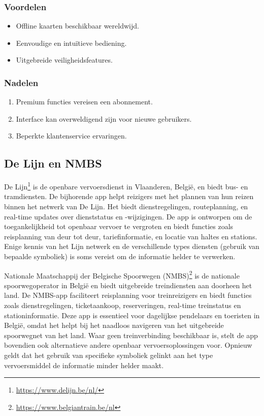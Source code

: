 \subsubsection*{Voordelen}
\begin{itemize}
    \item Offline kaarten beschikbaar wereldwijd.
    \item Eenvoudige en intuïtieve bediening.
    \item Uitgebreide veiligheidsfeatures.
\end{itemize}
\subsubsection*{Nadelen}
\begin{enumerate}
    \item Premium functies vereisen een abonnement.
    \item Interface kan overweldigend zijn voor nieuwe gebruikers.
    \item Beperkte klantenservice ervaringen.
\end{enumerate}

\subsection{De Lijn en NMBS}
De Lijn\footnote{\url{https://www.delijn.be/nl/}} is de openbare vervoersdienst in Vlaanderen, België, en biedt bus- en tramdiensten. De bijhorende app helpt reizigers met het plannen van hun reizen binnen het netwerk van De Lijn. Het biedt dienstregelingen, routeplanning, en real-time updates over dienststatus en -wijzigingen. De app is ontworpen om de toegankelijkheid tot openbaar vervoer te vergroten en biedt functies zoals reisplanning van deur tot deur, tariefinformatie, en locatie van haltes en stations. Enige kennis van het Lijn netwerk en de verschillende types diensten (gebruik van bepaalde symboliek) is soms vereist om de informatie helder te verwerken.

Nationale Maatschappij der Belgische Spoorwegen (NMBS)\footnote{\url{https://www.belgiantrain.be/nl}} is de nationale spoorwegoperator in België en biedt uitgebreide treindiensten aan doorheen het land. De NMBS-app faciliteert reisplanning voor treinreizigers en biedt functies zoals dienstregelingen, ticketaankoop, reserveringen, real-time treinstatus en stationinformatie. Deze app is essentieel voor dagelijkse pendelaars en toeristen in België, omdat het helpt bij het naadloos navigeren van het uitgebreide spoorwegnet van het land. Waar geen treinverbinding beschikbaar is, stelt de app bovendien ook alternatieve andere openbaar vervoersoplossingen voor. Opnieuw geldt dat het gebruik van specifieke symboliek gelinkt aan het type vervoersmiddel de informatie minder helder maakt.

